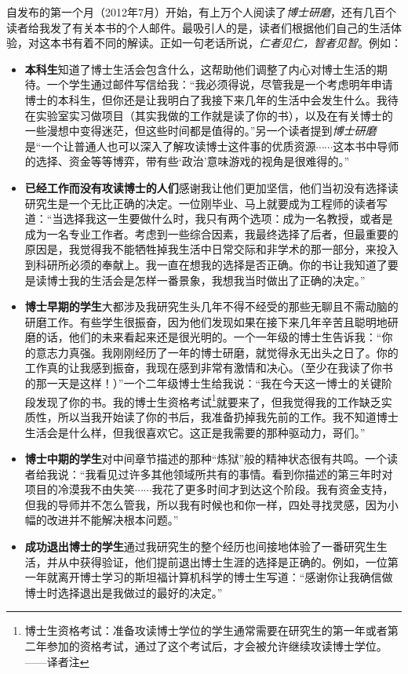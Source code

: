 \documentclass[12pt,UTF8,nofonts]{book}
\newcommand{\bookname}{博士研磨}
\begin{document}
自发布的第一个月（2012年7月）开始，有上万个人阅读了\emph{\bookname}，还有几百个读者给我发了有关本书的个人邮件。最吸引人的是，读者们根据他们自己的生活体验，对这本书有着不同的解读。正如一句老话所说，\emph{仁者见仁，智者见智}。例如：
\begin{itemize}
  \item \textbf{本科生}知道了博士生活会包含什么，这帮助他们调整了内心对博士生活的期待。一个学生通过邮件写信给我：“我必须得说，尽管我是一个考虑明年申请博士的本科生，但你还是让我明白了我接下来几年的生活中会发生什么。我待在实验室实习做项目（其实我做的工作就是读了你的书），以及在有关博士的一些漫想中变得迷茫，但这些时间都是值得的。”另一个读者提到\emph{\bookname}是“一个让普通人也可以深入了解攻读博士这件事的优质资源$\cdots\cdots$这本书中导师的选择、资金等等博弈，带有些‘政治’意味游戏的视角是很难得的。”
  \item \textbf{已经工作而没有攻读博士的人们}感谢我让他们更加坚信，他们当初没有选择读研究生是一个无比正确的决定。一位刚毕业、马上就要成为工程师的读者写道：“当选择我这一生要做什么时，我只有两个选项：成为一名教授，或者是成为一名专业工作者。考虑到一些综合因素，我最终选择了后者，但最重要的原因是，我觉得我不能牺牲掉我生活中日常交际和非学术的那一部分，来投入到科研所必须的奉献上。我一直在想我的选择是否正确。你的书让我知道了要是读博士我的生活会是怎样一番景象，我想我当时做出了正确的决定。”
  \item \textbf{博士早期的学生}大都涉及我研究生头几年不得不经受的那些无聊且不需动脑的研磨工作。有些学生很振奋，因为他们发现如果在接下来几年辛苦且聪明地研磨的话，他们的未来看起来还是很光明的。一个一年级的博士生告诉我：“你的意志力真强。我刚刚经历了一年的博士研磨，就觉得永无出头之日了。你的工作真的让我感到振奋，我现在感到非常有激情和决心。（至少在我读了你书的那一天是这样！）”一个二年级博士生给我说：“我在今天这一博士的关键阶段发现了你的书。我的博士生资格考试\footnote{博士生资格考试：准备攻读博士学位的学生通常需要在研究生的第一年或者第二年参加的资格考试，通过了这个考试后，才会被允许继续攻读博士学位。——译者注}就要来了，但我觉得我的工作缺乏实质性，所以当我开始读了你的书后，我准备扔掉我先前的工作。我不知道博士生活会是什么样，但我很喜欢它。这正是我需要的那种驱动力，哥们。”
  \item \textbf{博士中期的学生}对中间章节描述的那种“炼狱”般的精神状态很有共鸣。一个读者给我说：“我看见过许多其他领域所共有的事情。看到你描述的第三年时对项目的冷漠我不由失笑$\cdots\cdots$我花了更多时间才到达这个阶段。我有资金支持，但我的导师并不怎么管我，所以我有时候也和你一样，四处寻找灵感，因为小幅的改进并不能解决根本问题。”
  \item \textbf{成功退出博士的学生}通过我研究生的整个经历也间接地体验了一番研究生生活，并从中获得验证，他们提前退出博士生涯的选择是正确的。例如，一位第一年就离开博士学习的斯坦福计算机科学的博士生写道：“感谢你让我确信做博士时选择退出是我做过的最好的决定。”

\end{itemize}
\end{document}
